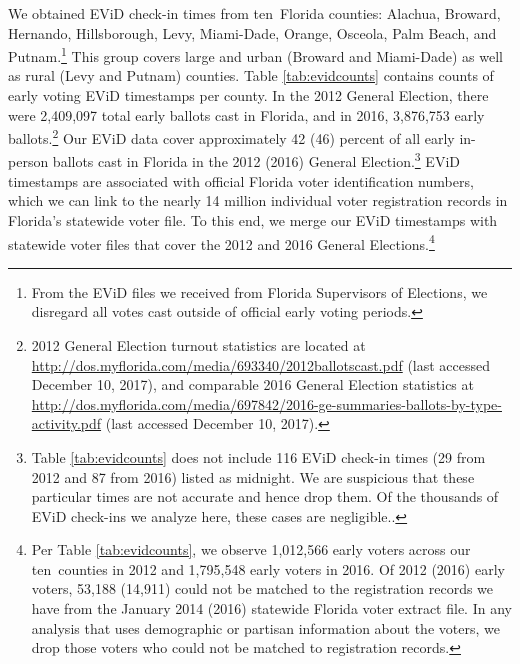\documentclass[12pt,titlepage]{article}
\newcommand{\numcounties}{ten}
\begin{document}
We obtained EViD check-in times from \numcounties\ Florida counties:
Alachua, Broward, Hernando, Hillsborough, Levy, Miami-Dade, Orange,
Osceola, Palm Beach, and Putnam.\footnote{From the EViD files we
  received from Florida Supervisors of Elections, we disregard all
  votes cast outside of official early voting periods.}  This group
covers large and urban (Broward and Miami-Dade) as well as rural (Levy
and Putnam) counties.  Table \ref{tab:evidcounts} contains counts of
early voting EViD timestamps per county. In the 2012 General Election,
there were 2,409,097 total early ballots cast in Florida, and in 2016,
3,876,753 early ballots.\footnote{2012 General Election turnout
  statistics are located at
  \url{http://dos.myflorida.com/media/693340/2012ballotscast.pdf}
  (last accessed December 10, 2017), and comparable 2016 General
  Election statistics at
  \url{http://dos.myflorida.com/media/697842/2016-ge-summaries-ballots-by-type-activity.pdf}
  (last accessed December 10, 2017).} Our EViD data cover
approximately 42 (46) percent of all early in-person ballots cast in
Florida in the 2012 (2016) General Election.\footnote{Table
  \ref{tab:evidcounts} does not include 116 EViD check-in times (29
  from 2012 and 87 from 2016) listed as midnight.  We are suspicious
  that these particular times are not accurate and hence drop them. Of
  the thousands of EViD check-ins we analyze here, these cases are
  negligible.\label{fn:midnight}.}  EViD timestamps are associated
with official Florida voter identification numbers, which we can link
to the nearly 14 million individual voter registration records in
Florida's statewide voter file. To this end, we merge our EViD
timestamps with statewide voter files that cover the 2012 and 2016
General Elections.\footnote{Per Table \ref{tab:evidcounts}, we observe
  1,012,566 early voters across our \numcounties\ counties in 2012 and
  1,795,548 early voters in 2016. Of 2012 (2016) early voters, 53,188
  (14,911) could not be matched to the registration records we have
  from the January 2014 (2016) statewide Florida voter extract file.
  In any analysis that uses demographic or partisan information about
  the voters, we drop those voters who could not be matched to
  registration records.}


\end{document}
